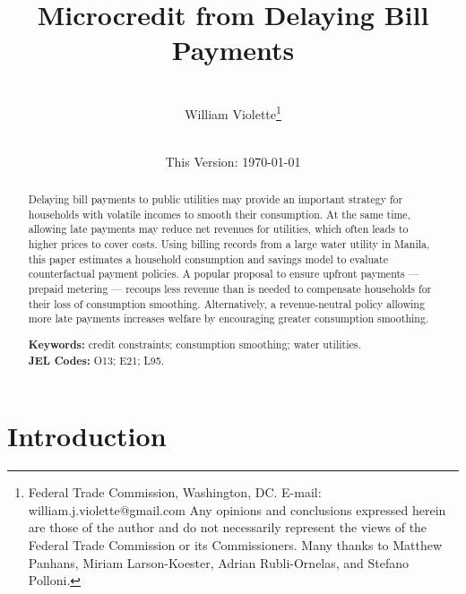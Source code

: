 \documentclass[12pt,table]{article}
\begin{document}
\begin{titlepage} 
\title{Microcredit from Delaying Bill Payments}
\author{\\[3em]
  William Violette\thanks{Federal Trade Commission, Washington, DC. E-mail: william.j.violette@gmail.com   Any opinions and conclusions expressed herein are those of the author and do not necessarily represent the views of the Federal Trade Commission or its Commissioners.  Many thanks to Matthew Panhans, Miriam Larson-Koester, Adrian Rubli-Ornelas, and Stefano Polloni.} \\
 \\ 
  }
\vspace{30mm}
\date{\vspace{5mm}This Version: \today}
\maketitle
\begin{abstract}

Delaying bill payments to public utilities may provide an important strategy for households with volatile incomes to smooth their consumption.  At the same time, allowing late payments may reduce net revenues for utilities, which often leads to higher prices to cover costs.  Using billing records from a large water utility in Manila, this paper estimates a household consumption and savings model to evaluate counterfactual payment policies.  A popular proposal to ensure upfront payments --- prepaid metering --- recoups less revenue than is needed to compensate households for their loss of consumption smoothing.  Alternatively, a revenue-neutral policy allowing more late payments increases welfare by encouraging greater consumption smoothing.



\vspace{1in}
\textbf{Keywords:} credit constraints; consumption smoothing; water utilities. \\
\textbf{JEL Codes:} O13; E21; L95. \\
\bigskip
\end{abstract}
\setcounter{page}{0}
\thispagestyle{empty}
\end{titlepage}
\pagebreak \newpage

\onehalfspacing

\section{Introduction}
\end{document}
